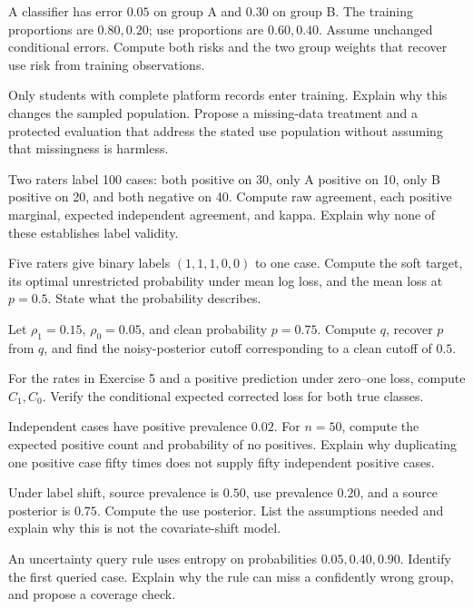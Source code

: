 \begin{exercises}
\item {}A classifier has error $0.05$ on group A and $0.30$ on group B. The training proportions are $0.80,0.20$; use proportions are $0.60,0.40$. Assume unchanged conditional errors. Compute both risks and the two group weights that recover use risk from training observations.
\item {}Only students with complete platform records enter training. Explain why this changes the sampled population. Propose a missing-data treatment and a protected evaluation that address the stated use population without assuming that missingness is harmless.
\item {}Two raters label 100 cases: both positive on 30, only A positive on 10, only B positive on 20, and both negative on 40. Compute raw agreement, each positive marginal, expected independent agreement, and kappa. Explain why none of these establishes label validity.
\item {}Five raters give binary labels $(1,1,1,0,0)$ to one case. Compute the soft target, its optimal unrestricted probability under mean log loss, and the mean loss at $p=0.5$. State what the probability describes.
\item {}Let $\rho_1=0.15$, $\rho_0=0.05$, and clean probability $p=0.75$. Compute $q$, recover $p$ from $q$, and find the noisy-posterior cutoff corresponding to a clean cutoff of $0.5$.
\item {}For the rates in Exercise 5 and a positive prediction under zero--one loss, compute $C_1,C_0$. Verify the conditional expected corrected loss for both true classes.
\item {}Independent cases have positive prevalence $0.02$. For $n=50$, compute the expected positive count and probability of no positives. Explain why duplicating one positive case fifty times does not supply fifty independent positive cases.
\item {}Under label shift, source prevalence is $0.50$, use prevalence $0.20$, and a source posterior is $0.75$. Compute the use posterior. List the assumptions needed and explain why this is not the covariate-shift model.
\item {}An uncertainty query rule uses entropy on probabilities $0.05,0.40,0.90$. Identify the first queried case. Explain why the rule can miss a confidently wrong group, and propose a coverage check.

\end{exercises}
